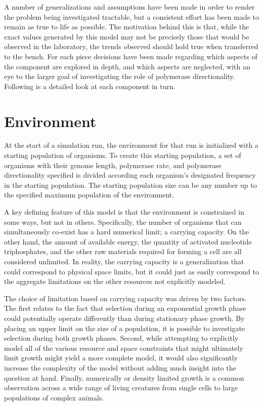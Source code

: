 A number of generalizations and assumptions have been made in order to render the problem being investigated tractable, but a consistent effort has been made to remain as true to life as possible. The motivation behind this is that, while the exact values generated by this model may not be precisely those that would be observed in the laboratory, the trends observed should hold true when transferred to the bench. For each piece decisions have been made regarding which aspects of the component are explored in depth, and which aspects are neglected, with an eye to the larger goal of investigating the role of polymerase directionality. Following is a detailed look at each component in turn.

\section*{Environment} %
\label{sec:environment}
At the start of a simulation run, the environment for that run is initialized with a starting population of organisms. To create this starting population, a set of organisms with their genome length, polymerase rate, and polymerase directionality specified is divided according each organism's designated frequency in the starting population. The starting population size can be any number up to the specified maximum population of the environment.

A key defining feature of this model is that the environment is constrained in some ways, but not in others. Specifically, the number of organisms that can simultaneously co-exist has a hard numerical limit; a carrying capacity. On the other hand, the amount of available energy, the quantity of activated nucleotide triphosphates, and the other raw materials required for forming a cell are all considered unlimited. In reality, the carrying capacity is a generalization that could correspond to physical space limits, but it could just as easily correspond to the aggregate limitations on the other resources not explicitly modeled.

The choice of limitation based on carrying capacity was driven by two factors. The first relates to the fact that selection during an exponential growth phase could potentially operate differently than during stationary phase growth. By placing an upper limit on the size of a population, it is possible to investigate selection during both growth phases. Second, while attempting to explicitly model all of the various resource and space constraints that might ultimately limit growth might yield a more complete model, it would also significantly increase the complexity of the model without adding much insight into the question at hand. Finally, numerically or density limited growth is a common observation across a wide range of living creatures from single cells to large populations of complex animals.

